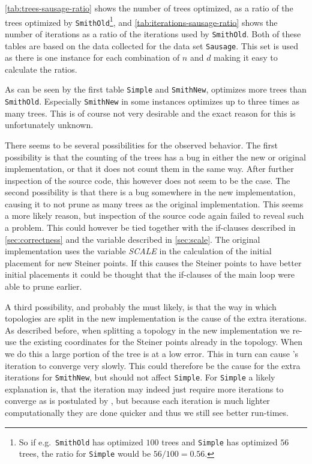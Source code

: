 \cref{tab:trees-sausage-ratio} shows the number of trees optimized, as a ratio
of the trees optimized by \texttt{SmithOld}\footnote{So if e.g.\
  \texttt{SmithOld} has optimized $100$ trees and \texttt{Simple} has optimized
  $56$ trees, the ratio for \texttt{Simple} would be $56/100 = 0.56$.}, and
\cref{tab:iterations-sausage-ratio} shows the number of iterations as a ratio of
the iterations used by \texttt{SmithOld}. Both of these tables are based on the
data collected for the data set \texttt{Sausage}. This set is used as there is one instance for each combination
of $n$ and $d$ making it easy to calculate the ratios.

As can be seen by the first table \texttt{Simple} and \texttt{SmithNew},
optimizes more trees than \texttt{SmithOld}. Especially \texttt{SmithNew} in
some instances optimizes up to three times as many trees. This is of course not
very desirable and the exact reason for this is unfortunately unknown.

There seems to be several possibilities for the observed behavior. The first
possibility is that the counting of the trees has a bug in either the new or original
implementation, or that it does not count them in the same way. After further
inspection of the source code, this however does not seem to be the case. The
second possibility is that there is a bug somewhere in the new implementation,
causing it to not prune as many trees as the original implementation. This seems
a more likely reason, but inspection of the source code again failed to reveal
such a problem. This could however be tied together with the if-clauses
described in \cref{sec:correctness} and the variable described in
\cref{sec:scale}. The original implementation uses the variable \textit{SCALE} in the
calculation of the initial placement for new Steiner points. If this causes the
Steiner points to have better initial placements it could be thought that the
if-clauses of the main loop were able to prune earlier.

A third possibility, and probably the must likely, is that the way in which
topologies are split in the new implementation is the cause of the extra
iterations. As described before, when splitting a topology in the new
implementation we re-use the existing coordinates for the Steiner points already
in the topology. When we do this a large portion of the tree is at a low error.
This in turn can cause \citeauthor{smith1992}'s iteration to converge very
slowly. This could therefore be the cause for the extra iterations for
\texttt{SmithNew}, but should not affect \texttt{Simple}. For \texttt{Simple} a
likely explanation is, that the iteration may indeed just require more
iterations to converge as is postulated by \textcite{smith1992}, but because
each iteration is much lighter computationally they are done quicker and thus we
still see better run-times.

